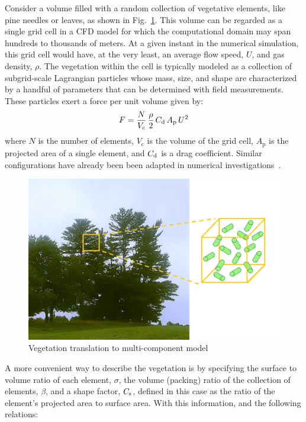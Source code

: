 \documentclass[12pt]{article}
\begin{document}
Consider a volume filled with a random collection of vegetative elements, like pine needles or leaves, as shown in Fig.~\ref{fig:Canopymod}. This volume can be regarded as a single grid cell in a CFD model for which the computational domain may span hundreds to thousands of meters. At a given instant in the numerical simulation, this grid cell would have, at the very least, an average flow speed, $U$, and gas density, $\rho$.  The vegetation within the cell is typically modeled as a collection of subgrid-scale Lagrangian particles whose mass, size, and shape are characterized by a handful of parameters that can be determined with field measurements. These particles exert a force per unit volume given by:
\begin{equation}
\label{eq:DragForce}
F = \frac{N}{V_{\mathrm{c}}} \, \frac{\rho}{2} \,  C_{\rm d} \, A_{\mathrm{p}} \, U^2
\end{equation}
where $N$ is the number of elements, $V_{\mathrm{c}}$ is the volume of the grid cell, $A_{\mathrm{p}}$ is the projected area of a single element, and $C_{\rm d}$ is a drag coefficient. Similar configurations have already been been adapted in numerical investigations~\cite{Pimont2009, Dupont2008}.
\begin{figure}[!ht]
	\centering 	\includegraphics[width=1.0\linewidth]{Picture1.jpg}
	\caption{Vegetation translation to multi-component model}
	\label{fig:Canopymod}
\end{figure}
A more convenient way to describe the vegetation is by specifying the surface to volume ratio of each element, $\sigma$, the volume (packing) ratio of the collection of elements, $\beta$, and a shape factor, $C_{\rm s}$, defined in this case as the ratio of the element's projected area to surface area. With this information, and the following relations:
\end{document}
